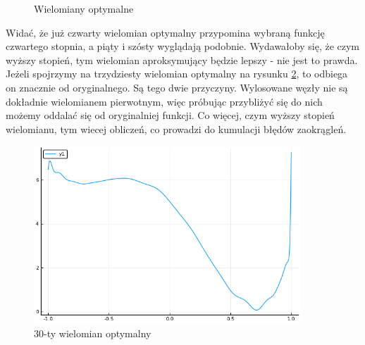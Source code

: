 \documentclass[11pt]{article}
\begin{document}
\begin{figure}
    \qquad
    \caption{Wielomiany optymalne}
    \label{fig:example}%
\end{figure}

Widać, że już czwarty wielomian optymalny przypomina wybraną funkcję czwartego stopnia, a piąty i szósty wyglądają podobnie. Wydawałoby się, że czym wyższy stopień, tym wielomian aproksymujący będzie lepszy - nie jest to prawda. Jeżeli spojrzymy na trzydziesty wielomian optymalny na rysunku \ref{fig:wykres4}, to odbiega on znacznie od oryginalnego. Są tego dwie przyczyny. Wylosowane węzły nie są dokładnie wielomianem pierwotnym, więc próbując przybliżyć się do nich możemy oddalać się od oryginalniej funkcji. Co więcej, czym wyższy stopień wielomianu, tym wiecej obliczeń, co prowadzi do kumulacji błędów zaokrągleń. 
\begin{figure}[!htbp]
  \includegraphics[width=10cm]{opt30.png}
  \centering
  \caption{30-ty wielomian optymalny}
  \label{fig:wykres4}
\end{figure}
\end{document}
